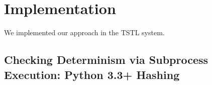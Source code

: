 \section{Implementation}

We implemented our approach in the TSTL \cite{NFM15} system.

\subsection{Checking Determinism via Subprocess Execution:  Python
  3.3+ Hashing}